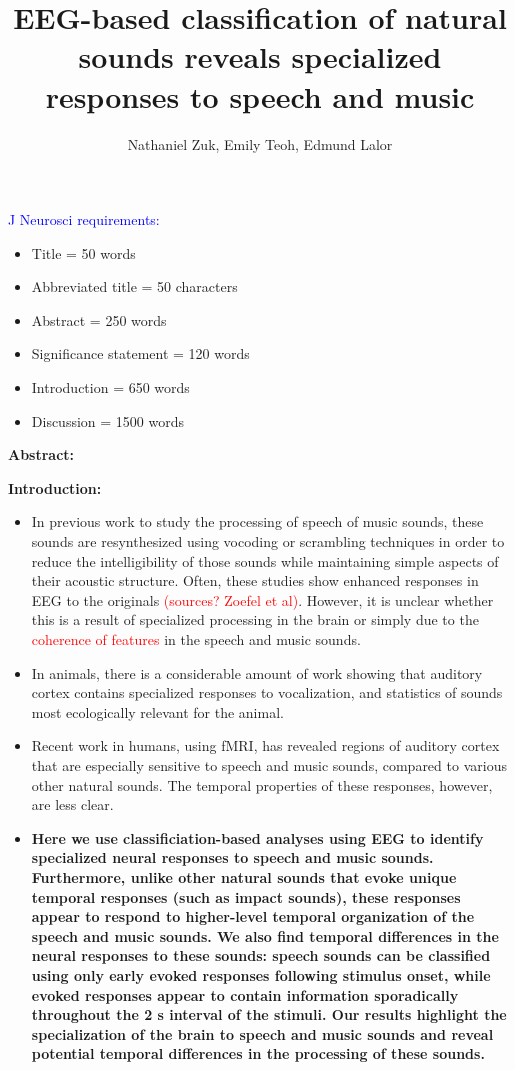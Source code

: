 \documentclass[11pt]{article}
\title{EEG-based classification of natural sounds reveals specialized responses to speech and music}
\author{Nathaniel Zuk, Emily Teoh, Edmund Lalor}
\begin{document}
\maketitle

\textcolor{blue}{J Neurosci requirements:}

\begin{itemize}
\item Title = 50 words
\item Abbreviated title = 50 characters
\item Abstract = 250 words
\item Significance statement = 120 words
\item Introduction = 650 words
\item Discussion = 1500 words
\end{itemize}

\textbf{Abstract:}

\textbf{Introduction:}

\begin{itemize}
\item In previous work to study the processing of speech of music sounds, these sounds are resynthesized using vocoding or scrambling techniques in order to reduce the intelligibility of those sounds while maintaining simple aspects of their acoustic structure. Often, these studies show enhanced responses in EEG to the originals \textcolor{red}{(sources? Zoefel et al)}.  However, it is unclear whether this is a result of specialized processing in the brain or simply due to the \textcolor{red}{coherence of features} in the speech and music sounds.
\item In animals, there is a considerable amount of work showing that auditory cortex contains specialized responses to vocalization, and statistics of sounds most ecologically relevant for the animal.
\item Recent work in humans, using fMRI, has revealed regions of auditory cortex that are especially sensitive to speech and music sounds, compared to various other natural sounds.  The temporal properties of these responses, however, are less clear.
\item \textbf{Here we use classificiation-based analyses using EEG to identify specialized neural responses to speech and music sounds.  Furthermore, unlike other natural sounds that evoke unique temporal responses (such as impact sounds), these responses appear to respond to higher-level temporal organization of the speech and music sounds.  We also find temporal differences in the neural responses to these sounds: speech sounds can be classified using only early evoked responses following stimulus onset, while evoked responses appear to contain information sporadically throughout the 2 s interval of the stimuli.  Our results highlight the specialization of the brain to speech and music sounds and reveal potential temporal differences in the processing of these sounds.}
\end{itemize}
\end{document}
